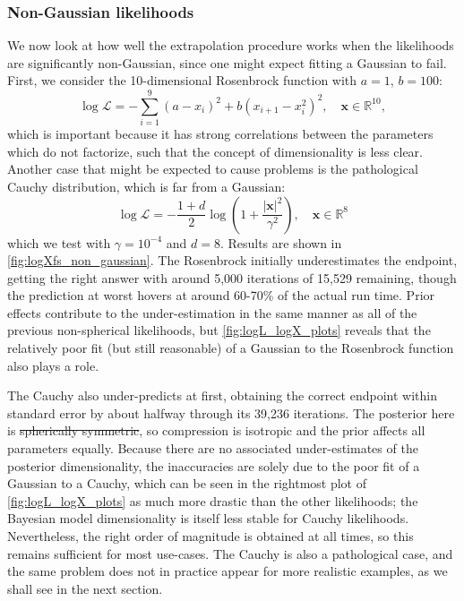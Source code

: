 \documentclass[usenatbib]{mnras}
\newcommand{\Like}{\mathcal{L}}
\providecommand{\DIFaddtex}[1]{{\protect\color{blue}\uwave{#1}}} %
\providecommand{\DIFdeltex}[1]{{\protect\color{red}\sout{#1}}}                      %
\providecommand{\DIFaddbegin}{} %
\providecommand{\DIFaddend}{} %
\providecommand{\DIFdelbegin}{} %
\providecommand{\DIFdelend}{} %
\providecommand{\DIFadd}[1]{\texorpdfstring{\DIFaddtex{#1}}{#1}} %
\providecommand{\DIFdel}[1]{\texorpdfstring{\DIFdeltex{#1}}{}} %
\newcommand{\DIFscaledelfig}{0.5}
\newlength{\DIFdelgraphicswidth} %
\newlength{\DIFdelgraphicsheight} %
\newcommand{\DIFaddincludegraphics}[2][]{{\color{blue}\fbox{\DIFOincludegraphics[#1]{#2}}}} %
\newcommand{\DIFdelincludegraphics}[2][]{%
\sbox{\DIFdelgraphicsbox}{\DIFOincludegraphics[#1]{#2}}%
\settoboxwidth{\DIFdelgraphicswidth}{\DIFdelgraphicsbox} %
\settoboxtotalheight{\DIFdelgraphicsheight}{\DIFdelgraphicsbox} %
\scalebox{\DIFscaledelfig}{%
\parbox[b]{\DIFdelgraphicswidth}{\usebox{\DIFdelgraphicsbox}\\[-\baselineskip] \rule{\DIFdelgraphicswidth}{0em}}\llap{\resizebox{\DIFdelgraphicswidth}{\DIFdelgraphicsheight}{%
\setlength{\unitlength}{\DIFdelgraphicswidth}%
\begin{picture}(1,1)%
\thicklines\linethickness{2pt} %
{\color[rgb]{1,0,0}\put(0,0){\framebox(1,1){}}}%
{\color[rgb]{1,0,0}\put(0,0){\line( 1,1){1}}}%
{\color[rgb]{1,0,0}\put(0,1){\line(1,-1){1}}}%
\end{picture}%
}\hspace*{3pt}}} %
} %
\DeclareRobustCommand{\DIFaddbegin}{\DIFOaddbegin \let\includegraphics\DIFaddincludegraphics} %
\DeclareRobustCommand{\DIFaddend}{\DIFOaddend \let\includegraphics\DIFOincludegraphics} %
\DeclareRobustCommand{\DIFdelbegin}{\DIFOdelbegin \let\includegraphics\DIFdelincludegraphics} %
\DeclareRobustCommand{\DIFdelend}{\DIFOaddend \let\includegraphics\DIFOincludegraphics} %
\begin{document}
\subsubsection{Non-Gaussian likelihoods}
We now look at how well the extrapolation procedure works when the likelihoods are significantly non-Gaussian, since one might expect fitting a Gaussian to fail. 
First, we consider the 10-dimensional Rosenbrock function with $a = 1$,  $b = 100$:
\begin{equation}
    \log \Like = - \sum_{i = 1}^{9} \left(a - x_i\right)^2 + b\left(x_{i+1} - x_i^2\right)^2, \quad \bm{x} \in \mathbb{R}^{10},
\end{equation}
which is important because it has strong correlations between the parameters which do not factorize, such that the concept of dimensionality is less clear. Another case that might be expected to cause problems is the pathological Cauchy distribution, which is far from a Gaussian:
\begin{equation}
    \log\Like = - \frac{1+d}{2} \log \left( 1 + \frac{|\bm{x}|^2}{\gamma^2}\right), \quad \bm{x} \in \mathbb{R}^8
\end{equation}
which we test with $\gamma = 10^{-4}$ and $d = 8$. Results are shown in \cref{fig:logXfs_non_gaussian}. The Rosenbrock initially underestimates the endpoint, getting the right answer with around 5,000 iterations of 15,529 remaining, though the prediction at worst hovers at around 60-70\% of the actual run time. Prior effects contribute to the under-estimation in the same manner as all of the previous non-spherical likelihoods, but \cref{fig:logL_logX_plots} reveals that the relatively poor fit (but still reasonable) of a Gaussian to the Rosenbrock function also plays a role.
\par
The Cauchy also under-predicts at first, obtaining the correct endpoint within standard error by about halfway through its 39,236 iterations. The posterior here is \DIFdelbegin \DIFdel{spherically symmetric}\DIFdelend \DIFaddbegin \DIFadd{spherical}\DIFaddend , so compression is isotropic and the prior affects all parameters equally. Because there are no associated under-estimates of the posterior dimensionality, the inaccuracies are solely due to the poor fit of a Gaussian to a Cauchy, which can be seen in the rightmost plot of \cref{fig:logL_logX_plots} as much more drastic than the other likelihoods; the Bayesian model dimensionality is itself less stable for Cauchy likelihoods. Nevertheless, the right order of magnitude is obtained at all times, so this remains sufficient for most use-cases. The Cauchy is also a pathological case, and the same problem does not in practice appear for more realistic examples, as we shall see in the next section.
\end{document}
